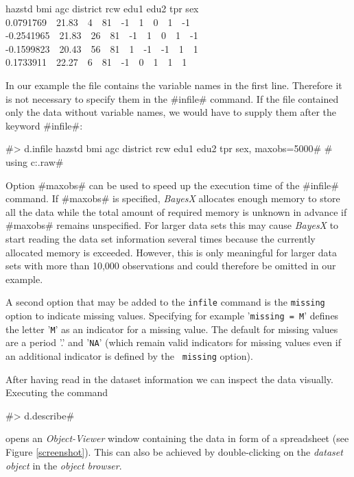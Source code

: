 \documentclass{article}
\begin{document}
{\footnotesize
 hazstd bmi agc district rcw edu1 edu2 tpr sex\\
 0.0791769 \,\, 21.83 \,\, 4 \,\, 81 \,\, -1 \,\, 1 \,\, 0 \,\, 1 \,\, -1\\
 -0.2541965 \,\, 21.83 \,\, 26 \,\, 81 \,\, -1 \,\, 1 \,\, 0 \,\, 1 \,\, -1\\
 -0.1599823 \,\, 20.43 \,\, 56 \,\, 81 \,\, 1 \,\, -1 \,\, -1 \,\, 1 \,\, 1\\
 0.1733911 \,\, 22.27 \,\, 6 \,\, 81 \,\, -1 \,\, 0 \,\, 1 \,\, 1 \,\, 1}

In our example the file contains the variable names in the first
line. Therefore it is not necessary to specify them in the
#infile# command. If the file contained only the data without
variable names, we would have to supply them after the keyword
#infile#:

 #> d.infile hazstd bmi agc district rcw edu1 edu2 tpr sex, maxobs=5000#
 #  using c:\data\zambia.raw#


Option #maxobs# can be used to speed up the execution time of the
#infile# command. If #maxobs# is specified, {\it BayesX} allocates
enough memory to store all the data while the total amount of
required memory is unknown in advance if #maxobs# remains
unspecified. For larger data sets this may cause {\it BayesX} to
start reading the data set information several times because the
currently allocated memory is exceeded. However, this is only
meaningful for larger data sets with more than 10,000 observations
and could therefore be omitted in our example.

A second option that may be added to the {\tt infile} command is the
{\tt missing} option to indicate missing values. Specifying for
example '{\tt missing = M}' defines the letter '{\tt M}' as an
indicator for a missing value. The default for missing values are a
period '.' and '{\tt NA}' (which remain valid indicators for missing
values even if an additional indicator is defined by the {\tt
missing} option).

After having read in the dataset information we can inspect the
data visually. Executing the command

#> d.describe#

opens an {\it Object-Viewer} window containing the data in form of
a spreadsheet (see Figure \ref{screenshot}). This can also be
achieved by double-clicking on the {\it dataset object} in the
{\it object browser}.

\vspace{1cm}
\end{document}
